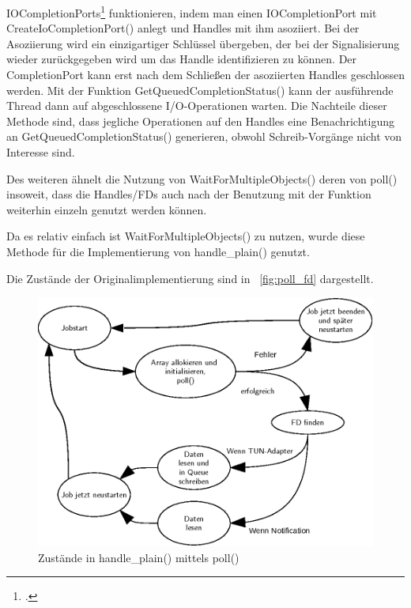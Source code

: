 {IOCompletionPorts\footcite[][]{_createiocompletionport_2016} funktionieren, indem man einen IOCompletionPort mit CreateIoCompletionPort()
anlegt und Handles mit ihm asoziiert. Bei der Asoziierung wird ein einzigartiger Schlüssel
übergeben, der bei der Signalisierung wieder zurückgegeben wird um das Handle identifizieren zu können.
Der CompletionPort kann erst nach dem Schließen der asoziierten Handles geschlossen werden.
Mit der Funktion GetQueuedCompletionStatus() kann der ausführende Thread dann auf abgeschlossene
I/O-Operationen warten.
Die Nachteile dieser Methode sind, dass jegliche Operationen auf den Handles eine Benachrichtigung
an GetQueuedCompletionStatus() generieren, obwohl Schreib-Vorgänge nicht von Interesse sind.

Des weiteren ähnelt die Nutzung von WaitForMultipleObjects() deren von poll()
insoweit, dass die Handles/\acp{FD} auch nach der Benutzung mit der Funktion
weiterhin einzeln genutzt werden können.

Da es relativ einfach ist WaitForMultipleObjects() zu nutzen, wurde diese Methode
für die Implementierung von handle\_plain() genutzt.

Die Zustände der Originalimplementierung sind in ~\autoref{fig:poll_fd}
dargestellt.

\begin{figure}
\centering
\def\svgwidth{\columnwidth}
\includegraphics[width=\textwidth]{poll_fd.eps}
\caption{Zustände in handle\_plain() mittels poll()}
\label{fig:poll_fd}
\end{figure}

}

